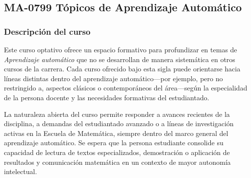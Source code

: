 \newpage
\subsection*{MA-0799 Tópicos de Aprendizaje Automático}

\hypertarget{MA0799}{}
\begin{refsection}
\begin{table}[H]
\end{table}

\subsubsection*{Descripción del curso}

Este curso optativo ofrece un espacio formativo para profundizar en temas de \emph{Aprendizaje automático} que no se desarrollan de manera sistemática en otros cursos de la carrera. Cada curso ofrecido bajo esta sigla puede orientarse hacia líneas distintas dentro del aprendizaje automático---por ejemplo, pero no restringido a, aspectos clásicos o contemporáneos del área---según la especialidad de la persona docente y las necesidades formativas del estudiantado.

La naturaleza abierta del curso permite responder a avances recientes de la disciplina, a demandas del estudiantado avanzado o a líneas de investigación activas en la Escuela de Matemática, siempre dentro del marco general del aprendizaje automático. Se espera que la persona estudiante consolide su capacidad de lectura de textos especializados, demostración o aplicación de resultados y comunicación matemática en un contexto de mayor autonomía intelectual.


\end{refsection}
